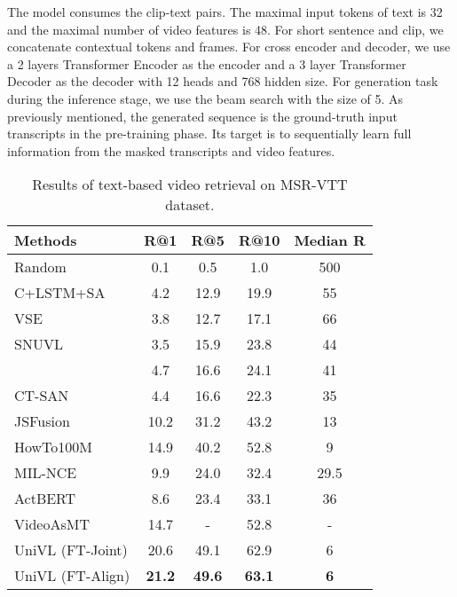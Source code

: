 \documentclass[11pt,a4paper]{article}
\begin{document}
	The model consumes the clip-text pairs. The maximal input tokens of text is 32 and the maximal number of video features is 48. For short sentence and clip, we concatenate contextual tokens and frames. For cross encoder and decoder, we use a 2 layers Transformer Encoder as the encoder and a 3 layer Transformer Decoder as the decoder with 12 heads and 768 hidden size. For generation task during the inference stage, we use the beam search with the size of 5. As previously mentioned, the generated sequence is the ground-truth input transcripts in the pre-training phase. Its target is to sequentially learn full information from the masked transcripts and video features.
	\begin{table*}[tp] 
		\setlength{\tabcolsep}{4pt}
		\centering
\begin{tabular}{lcccc}
			\toprule 
			Methods         & R@1   & R@5 & R@10 & Median R  \\ \midrule
			Random   & 0.1 & 0.5 & 1.0 & 500 \\  
C+LSTM+SA \cite{Torabi2016Learning}             & 4.2 & 12.9 & 19.9 & 55 \\  
VSE \cite{kiros2014unifying}            & 3.8 & 12.7 & 17.1 & 66 \\  
			SNUVL \cite{Yu2016VideoCaptioning}             & 3.5 & 15.9 & 23.8 & 44 \\  
			\citet{Kaufman2017Temporal}             & 4.7 & 16.6 & 24.1 & 41 \\ 
			CT-SAN \cite{Yu2017End}             & 4.4 & 16.6 & 22.3 & 35 \\ 
JSFusion \cite{yu2018joint}             & 10.2 & 31.2 & 43.2 & 13 \\ 
			HowTo100M \cite{miech2019howto100m}   & 14.9 & 40.2 & 52.8 & 9 \\ 
			MIL-NCE \cite{miech19endtoend} & 9.9 & 24.0 & 32.4 & 29.5 \\ 
			ActBERT \cite{Zhu_2020_CVPR}    & 8.6 & 23.4 & 33.1 & 36 \\ 
			VideoAsMT \cite{Korbar2020}   & 14.7 & - & 52.8 & - \\ 
			\midrule
			UniVL (FT-Joint)  & 20.6 & 49.1 & 62.9 & 6 \\
			UniVL (FT-Align)  & \textbf{21.2} & \textbf{49.6} & \textbf{63.1} & \textbf{6} \\
			\bottomrule
		\end{tabular}
\caption{Results of text-based video retrieval on MSR-VTT dataset.}
		\label{tab:result_of_retrieval_MSR-VTT}
	\end{table*}
	
\end{document}
